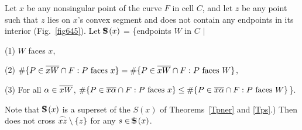\begin{lemma}
\label{lem-645}
Let $x$ be any nonsingular point of the curve $F$ in cell $C$,
and let $z$ be any point such that $z$ lies on $x$'s convex segment
and  does not contain any endpoints in its interior 
{\rm (}Fig.~{\rm \ref{fig645})}.
Let $\mbox{S\hspace{-0.68em}S\hspace{.25em}}(x)$ = \{endpoints $W$ in $C$ $\mid$

{\rm (1)} $W$ faces $x$,

{\rm (2)} \mbox{$\#\{P \in\mbox{$\overline{xW}$}\cap F: P \mbox{ faces $x$}\} =
\#\{P \in \mbox{$\overline{xW}$}\cap F: P \mbox{ faces $W$} \}$},

{\rm (3)} For all $\alpha \in \mbox{$\overline{xW}$}$,
$\#\{P \in\mbox{$\overline{x\alpha}$}\cap F: P \mbox{ faces $x$}\} \leq
\#\{P \in \mbox{$\overline{x\alpha}$}\cap F: P \mbox{ faces $W$}\} $\}.

\vspace{.05in}

\noindent {\rm (}Note that 
$\mbox{S\hspace{-0.68em}S\hspace{.25em}}(x)$ is a superset of the $S(x)$ of Theorems~{\rm \ref{Tpner}} and 
{\rm \ref{Tps}.)}
Then  does not cross $\mbox{$\stackrel{\frown}{xz}$} \setminus \{z\}$ 
for any $s \in \mbox{S\hspace{-0.68em}S\hspace{.25em}}(x)$.
\end{lemma}
%
%

